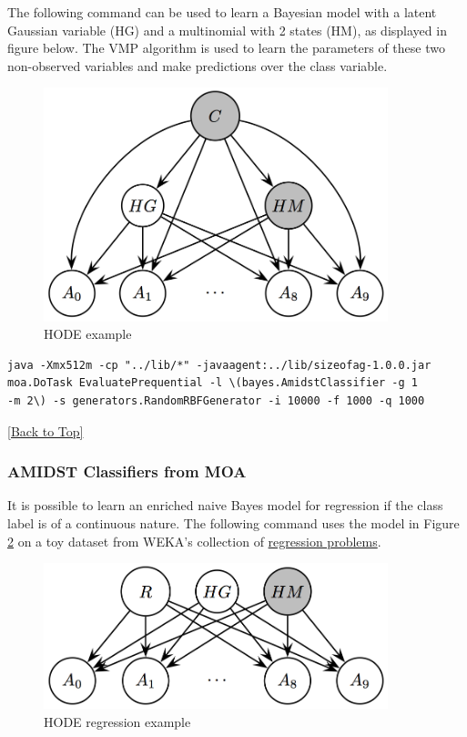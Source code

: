 \documentclass[10pt,a4paper]{article}
\begin{document}
The following command can be used to learn a Bayesian model with a latent Gaussian variable (HG) and a multinomial with 2 states (HM), as displayed in figure below. The VMP algorithm is used to learn the parameters of these two non-observed variables and make predictions over the class variable.

\begin{figure}[h!]
	\centering
	\includegraphics[width=10cm]{img/HODE.jpg}
	\caption{HODE example}
	\label{fig:bns:moalink:HODE}	
\end{figure}

\begin{lstlisting}
java -Xmx512m -cp "../lib/*" -javaagent:../lib/sizeofag-1.0.0.jar 
moa.DoTask EvaluatePrequential -l \(bayes.AmidstClassifier -g 1 
-m 2\) -s generators.RandomRBFGenerator -i 10000 -f 1000 -q 1000
\end{lstlisting}
\hyperref[sec:bns]{[Back to Top]}\newline 




\subsubsection{AMIDST Classifiers from MOA}\label{sec:bns:moalink:moareg}

It is possible to learn an enriched naive Bayes model for regression if the class label is of a continuous nature. The following command uses the model in Figure \ref{fig:bns:moalink:HODEreg} on a toy dataset from WEKA's collection of \href{http://prdownloads.sourceforge.net/weka/datasets-numeric.jar}{regression problems}.

\begin{figure}[h!]
	\centering
	\includegraphics[width=10cm]{img/regressionHODE.jpg}
	\caption{HODE regression example}
	\label{fig:bns:moalink:HODEreg}	
\end{figure}
\end{document}
